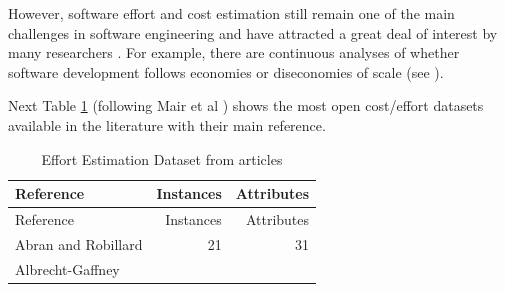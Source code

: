 \documentclass[]{book}
\begin{document}
However, software effort and cost estimation still remain one of the
main challenges in software engineering and have attracted a great deal
of interest by many researchers \citeyearpar{Jorgensen07}. For example,
there are continuous analyses of whether software development follows
economies or diseconomies of scale (see
\citep[\citet{Banker1994},\citet{Kitchenham2002}]{Dolado01_CostEst}).

Next Table \ref{tab:effEstimation} (following Mair et al
\citeyearpar{MairSJ05} ) shows the most open cost/effort datasets
available in the literature with their main reference.

\begin{longtable}[]{@{}lrr@{}}
\caption{\label{tab:effEstimation} Effort Estimation Dataset from
articles}\tabularnewline
\toprule
\begin{minipage}[b]{0.44\columnwidth}\raggedright\strut
Reference\strut
\end{minipage} & \begin{minipage}[b]{0.18\columnwidth}\raggedleft\strut
Instances\strut
\end{minipage} & \begin{minipage}[b]{0.18\columnwidth}\raggedleft\strut
Attributes\strut
\end{minipage}\tabularnewline
\midrule
\endfirsthead
\toprule
\begin{minipage}[b]{0.44\columnwidth}\raggedright\strut
Reference\strut
\end{minipage} & \begin{minipage}[b]{0.18\columnwidth}\raggedleft\strut
Instances\strut
\end{minipage} & \begin{minipage}[b]{0.18\columnwidth}\raggedleft\strut
Attributes\strut
\end{minipage}\tabularnewline
\midrule
\endhead
\begin{minipage}[t]{0.44\columnwidth}\raggedright\strut
Abran and Robillard \citeyearpar{Abran_TSE96_FP}\strut
\end{minipage} & \begin{minipage}[t]{0.18\columnwidth}\raggedleft\strut
21\strut
\end{minipage} & \begin{minipage}[t]{0.18\columnwidth}\raggedleft\strut
31\strut
\end{minipage}\tabularnewline
\begin{minipage}[t]{0.44\columnwidth}\raggedright\strut
Albrecht-Gaffney \citeyearpar{AlbrechtG83}\strut

\end{minipage}
\end{longtable}
\end{document}
